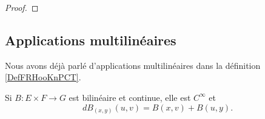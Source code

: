 \begin{proof}
\end{proof}

\subsection{Applications multilinéaires}

Nous avons déjà parlé d'applications multilinéaires dans la définition \ref{DefFRHooKnPCT}.

\begin{lemma}\label{LemFRdNDCd}
	Si \( B\colon E\times F\to G\) est bilinéaire et continue, elle est \(  C^{\infty}\) et
	\begin{equation}    \label{EqXYJgDBt}
		dB_{(x,y)}(u,v)=B(x,v)+B(u,y).
	\end{equation}
\end{lemma}

